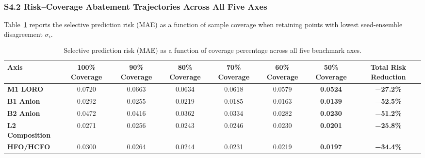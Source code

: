 
\subsubsection*{S4.2 Risk--Coverage Abatement Trajectories Across All Five Axes}
Table~\ref{tab:si_risk_coverage} reports the selective prediction risk (MAE) as a function of sample coverage when retaining points with lowest seed-ensemble disagreement $\sigma_i$.

\begin{table}[htbp]
\centering
\small
\caption{Selective prediction risk (MAE) as a function of coverage percentage across all five benchmark axes.}
\label{tab:si_risk_coverage}
\begin{tabular}{lccccccc}
\toprule
\textbf{Axis} & \textbf{100\% Coverage} & \textbf{90\% Coverage} & \textbf{80\% Coverage} & \textbf{70\% Coverage} & \textbf{60\% Coverage} & \textbf{50\% Coverage} & \textbf{Total Risk Reduction} \\
\midrule
\textbf{M1 LORO} & 0.0720 & 0.0663 & 0.0634 & 0.0618 & 0.0579 & \textbf{0.0524} & \textbf{−27.2\%} \\
\textbf{B1 Anion} & 0.0292 & 0.0255 & 0.0219 & 0.0185 & 0.0163 & \textbf{0.0139} & \textbf{−52.5\%} \\
\textbf{B2 Anion} & 0.0472 & 0.0416 & 0.0362 & 0.0334 & 0.0282 & \textbf{0.0230} & \textbf{−51.2\%} \\
\textbf{L2 Composition} & 0.0271 & 0.0256 & 0.0243 & 0.0246 & 0.0230 & \textbf{0.0201} & \textbf{−25.8\%} \\
\textbf{HFO/HCFO} & 0.0300 & 0.0264 & 0.0244 & 0.0231 & 0.0219 & \textbf{0.0197} & \textbf{−34.4\%} \\
\bottomrule
\end{tabular}
\end{table}

